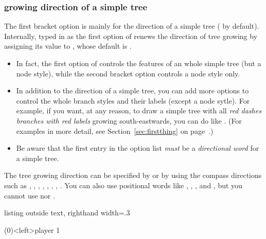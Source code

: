 \subsubsection*{growing direction of a simple tree}

The first bracket option is mainly for the direction of a simple tree (\xw{[south]} by default).
Internally,  typed in as the first option of \cmd{\istroot} renews the direction of tree growing by assigning its value to \icmd{\istgrowdirection}, whose default is .

\begin{adjustwidth}{\parindent}{\parindent}
\remark 
\begin{itemize}
\item In fact, the first option of \cmd{\istroot} controls the features of an whole simple tree (but a node style), while the second bracket option controls a node style only.
\item In addition to the direction of a simple tree, you can add more options to control the whole branch styles and their labels (except a node sytle).
For example, if you want, at any reason, to draw a simple tree with all \emph{red dashes branches with red labels} growing south-eastwards, you can do like .
(For examples in more detail, see Section~\ref{sec:firstthing} on page~\pageref{sec:firstthing}.)
\item Be aware that the first entry in the option list \emph{must} be a \emph{directional word} for a simple tree.
\end{itemize}
\end{adjustwidth}

The tree growing direction can be specified by \xw{[<degrees>]} or by using the compass directions such as 
\xw{[north]}, \xw{[south]}, \xw{[east]}, \xw{[west]}, , , , .
You can also use positional words like \xw{[left]}, \xw{[rigth]}, \xw{[down]}, and \xw{[up]}, but you cannot use \xw{[above]} nor \xw{[below]}.

\label{page:onesimpletree}
\begin{tcblisting}{listing outside text, righthand width=.3\linewidth}
\begin{istgame}[font=\itshape]
\istroot[right](0)<left>{player 1}
  \istb  \istb  \endist
\end{istgame}
\end{tcblisting}


